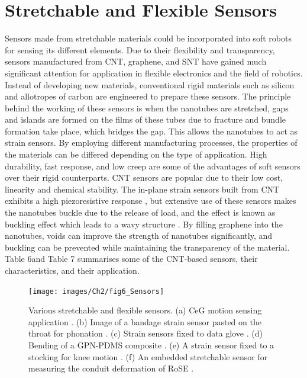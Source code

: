 \section{Stretchable and Flexible Sensors}

Sensors made from stretchable materials could be incorporated into soft robots for sensing its different elements. Due to their flexibility and transparency, sensors manufactured from \ac{CNT}, graphene, and \ac{SNT} have gained much significant attention for application in flexible electronics and the field of robotics. Instead of developing new materials, conventional rigid materials such as silicon and allotropes of carbon are engineered to prepare these sensors.  The principle behind the working of these sensors is when the nanotubes are stretched, gaps and islands are formed on the films of these tubes due to fracture and bundle formation take place, which bridges the gap. This allows the nanotubes to act as strain sensors. By employing different manufacturing processes, the properties of the materials can be differed depending on the type of application. High durability, fast response, and low creep are some of the advantages of soft sensors over their rigid counterparts. \ac{CNT} sensors are popular due to their low cost, linearity and chemical stability. The in-plane strain sensors built from \ac{CNT} exhibits a high piezoresistive response \cite{Miao2011Optimization,miao2012modelling}, but extensive use of these sensors makes the nanotubes buckle due to the release of load, and the effect is known as buckling effect which leads to a wavy structure \cite{Shi2016Graphene}. By filling graphene into the nanotubes, voids can improve the strength of nanotubes significantly, and buckling can be prevented while maintaining the transparency of the material. Table 6and Table 7 summarises some of the \ac{CNT}-based sensors, their characteristics, and their application.



\begin{figure}[bth]
	\myfloatalign
	{\texttt{[image: images/Ch2/fig6\_Sensors]}} \quad
	\caption[Various stretchable and flexible sensors.]{Various stretchable and flexible sensors. (a) CeG motion sensing application \cite{Shi2016Graphene}. (b) Image of a bandage strain sensor pasted on the throat for phonation \cite{Yamada2011Stretchable}. (c) Strain sensors fixed to data glove \cite{Yamada2011Stretchable}. (d) Bending of a GPN-PDMS composite \cite{pang2016flexible}. (e) A strain sensor fixed to a stocking for knee motion \cite{Yamada2011Stretchable}. (f) An embedded stretchable sensor for measuring the conduit deformation of RoSE \cite{Zhu2016Nanocomposite}.}\label{fig6_Sensors}
\end{figure}

